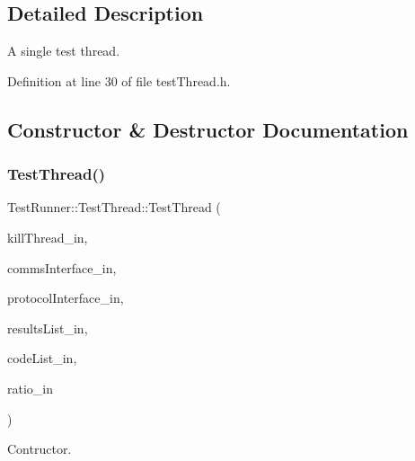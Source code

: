 \subsection{Detailed Description}
A single test thread. 

Definition at line 30 of file test\+Thread.\+h.



\subsection{Constructor \& Destructor Documentation}
\mbox{\label{classTestRunner_1_1TestThread_ac026c748166fa2f487419c957582f6a2}} 
\subsubsection{\texorpdfstring{TestThread()}{TestThread()}}
{\footnotesize\ttfamily Test\+Runner\+::\+Test\+Thread\+::\+Test\+Thread (\begin{DoxyParamCaption}\item[{const \mbox{\hyperlink{classutility_1_1ThreadSafeT}{utility\+::\+Thread\+SafeT}}$<$ bool $>$ \&}]{kill\+Thread\+\_\+in,  }\item[{std\+::shared\+\_\+ptr$<$ \mbox{\hyperlink{classCommunication_1_1I__communication}{Communication\+::\+I\+\_\+communication}} $>$ \&}]{comms\+Interface\+\_\+in,  }\item[{std\+::shared\+\_\+ptr$<$ \mbox{\hyperlink{classProtocol_1_1I__protocolInterface}{Protocol\+::\+I\+\_\+protocol\+Interface}} $>$ \&}]{protocol\+Interface\+\_\+in,  }\item[{\mbox{\hyperlink{classSafeContainers_1_1safeList}{Safe\+Containers\+::safe\+List}}$<$ \mbox{\hyperlink{structProtocol_1_1DataStruct}{Protocol\+::\+Data\+Struct}} $>$ \&}]{results\+List\+\_\+in,  }\item[{\mbox{\hyperlink{classSafeContainers_1_1safeList}{Safe\+Containers\+::safe\+List}}$<$ int $>$ \&}]{code\+List\+\_\+in,  }\item[{long}]{ratio\+\_\+in }\end{DoxyParamCaption})}



Contructor. 


